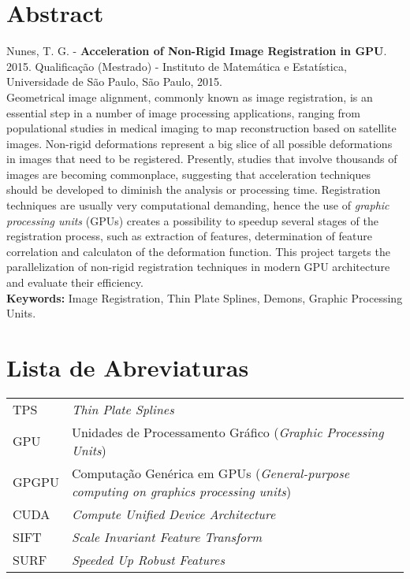 \documentclass[11pt,twoside,a4paper]{book}
\begin{document}
\chapter*{Abstract}
\noindent Nunes, T. G. - \textbf{Acceleration of Non-Rigid Image Registration in GPU}.
2015.
Qualificação (Mestrado) - Instituto de Matemática e Estatística,
Universidade de São Paulo, São Paulo, 2015.
\\
Geometrical image alignment, commonly known as image registration, is an essential step in a number of image processing applications,
ranging from populational studies in medical imaging to map reconstruction based on satellite images. Non-rigid deformations
represent a big slice of all possible deformations in images that need to be registered.
Presently, studies that involve thousands of images are becoming commonplace,
suggesting that acceleration techniques should be developed to diminish the analysis or processing time.
Registration techniques are usually very computational demanding, hence the use of \textit{graphic processing units} (GPUs)
creates a possibility to speedup several stages of the registration process, such as extraction of features,
determination of feature correlation and calculaton of the deformation function. This project targets the
parallelization of non-rigid registration techniques in modern GPU architecture and evaluate their
efficiency.
\\

\noindent \textbf{Keywords:} Image Registration, Thin Plate Splines, Demons, Graphic Processing Units.

\tableofcontents    %

\chapter{Lista de Abreviaturas}
\begin{tabular}{ll}
        TPS         & \textit{Thin Plate Splines}\\
        GPU         & Unidades de Processamento Gráfico (\textit{Graphic Processing Units})\\
        GPGPU       & Computação Genérica em GPUs (\textit{General-purpose computing on graphics processing units})\\
        CUDA        & \textit{Compute Unified Device Architecture}\\
        SIFT        & \textit{Scale Invariant Feature Transform} \\
        SURF        & \textit{Speeded Up Robust Features} \\
\end{tabular}
\end{document}
